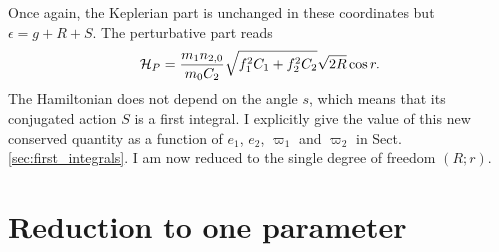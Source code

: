 \documentclass[12pt,a4paper,oneside]{article}
\begin{document}
Once again, the Keplerian part is unchanged in these coordinates but $\epsilon=g+R+S$. The perturbative part reads
\begin{equation}
	\mathcal{H}_P=\frac{m_1n_{2,0}}{m_0C_2}\sqrt{f_1^2C_1+f_2^2C_2}\sqrt{2R}\cos r.
\end{equation}
The Hamiltonian does not depend on the angle $s$, which means that its conjugated action $S$ is a first integral. I explicitly give the value of this new conserved quantity as a function of $e_1$, $e_2$, $\varpi_1$ and $\varpi_2$ in Sect. \ref{sec:first_integrals}. I am now reduced to the single degree of freedom $\left(R;r\right)$.

\section{Reduction to one parameter}\label{sec:1parameter}
\end{document}
